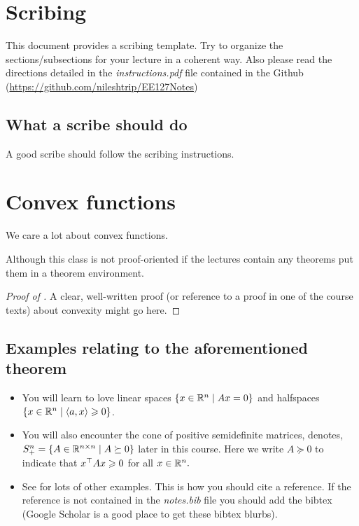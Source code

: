 \documentclass[12pt]{article}
\author{Scribes: Nilesh Tripuraneni \textit{(Change This To Your Names)}}
\date{01/01/01 \textit{(Change This to Lecture Date)}}
\begin{document}
\maketitle

\section{Scribing}

This document provides a scribing template. Try to organize the sections/subsections for your lecture in a coherent way. Also please read the directions detailed in the \emph{instructions.pdf} file contained in the Github (\url{https://github.com/nileshtrip/EE127Notes})

\subsection{What a scribe should do}

\begin{definition}
A good scribe should follow the scribing instructions.
\end{definition}

\section{Convex functions}
We care a lot about convex functions.

\begin{theorem}
Although this class is not proof-oriented if the lectures contain any theorems put them in a theorem environment.
\end{theorem}
\begin{proof}[Proof of ]
A clear, well-written proof (or reference to a proof in one of the course texts) about convexity might go here.
\end{proof}

\subsection{Examples relating to the aforementioned theorem}
\begin{itemize}
\item You will learn to love linear spaces $\{x\in\mathbb{R}^n\mid Ax=0\}$ and halfspaces $\{x\in\mathbb{R}^n \mid \langle a, x\rangle \geqslant 0 \}$.
\item You will also encounter the cone of positive semidefinite matrices, denotes, $S^n_+ = \{ A\in\mathbb{R}^{n\times n}\mid A\succeq 0\}$ later in this course. Here we write $A\succeq 0$ to indicate that $x^\top A x\geqslant 0$ for all $x\in\mathbb{R}^n.$
\item See \cite{boyd2004convex} for lots of other examples. This is how you should cite a reference. If the reference is not contained in the \emph{notes.bib} file you should add the bibtex (Google Scholar is a good place to get these bibtex blurbs).
\end{itemize}
\end{document}
